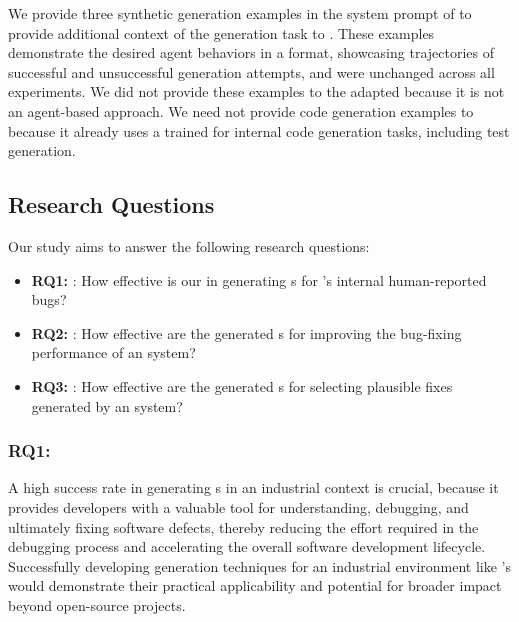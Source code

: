 We provide three synthetic \brt generation examples in the system prompt of \tool to provide additional context of the \brt generation task to \gemini{}.  
These examples demonstrate the desired agent behaviors in a \react format, showcasing trajectories of successful and unsuccessful \brt generation attempts, and were unchanged across all experiments. 
We did not provide these examples to the adapted \libro because it is not an agent-based approach. 
We need not provide code generation examples to \libro because it already uses a \codeeditingllm trained for \google internal code generation tasks, including test generation.



\subsection{Research Questions}
\label{sec:empiricalstudy:rq}
Our study aims to answer the following research questions:

\begin{itemize}
    \item \textbf{RQ1: \rqonetitle}: How effective is our \tool in generating \brt{}s for \google's internal human-reported bugs?
    \item \textbf{RQ2: \rqtwotitle}: How effective are the generated \brt{}s for improving the bug-fixing performance of an \autopr system?
    \item \textbf{RQ3: \rqthreetitle}: How effective are the generated \brt{}s for selecting plausible fixes generated by an \autopr system?
\end{itemize}

\subsubsection{RQ1: \rqonetitle}
\label{sec:empiricalstudy:rq1}
A high success rate in generating \brt{}s in an industrial context is crucial, because it provides developers with a valuable tool for understanding, debugging, and ultimately fixing software defects, thereby reducing the effort required in the debugging process and accelerating the overall software development lifecycle. 
Successfully developing \brt generation techniques for an industrial environment like \google's would demonstrate their practical applicability and potential for broader impact beyond open-source projects.

